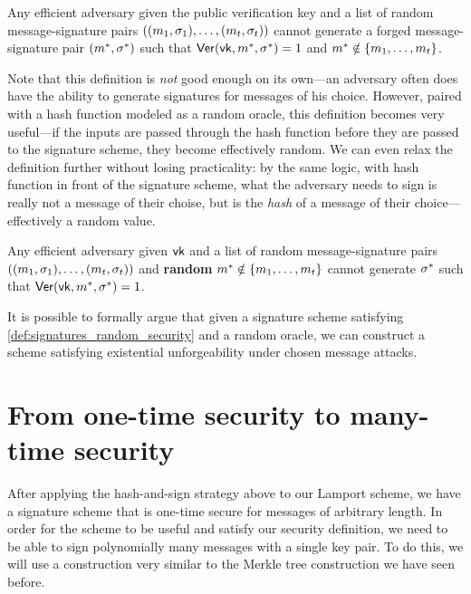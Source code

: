 \begin{definition}
Any efficient adversary given the public verification key and a list of random message-signature pairs $((m_1, \sigma_1), \ldots, (m_t, \sigma_t))$ cannot generate a forged
message-signature pair $(m^*, \sigma^*)$ 
such that $\mathsf{Ver}(\mathsf{vk}, m^*, \sigma^*) = 1$ and $m^* \notin \left\{ m_1, \ldots, m_t \right\}$.

\end{definition}

Note that this definition is \emph{not} good enough on its own---an adversary often does have the ability to generate signatures for messages of his choice. However, paired with a hash function modeled as a random oracle, this definition becomes very useful---if the inputs are passed through the hash function before they are passed to the signature scheme, they become effectively random. We can even relax the definition further without losing practicality: by the same logic, with hash function in front of the signature scheme, what the adversary needs to sign is really not a message of their choise, but is the \emph{hash} of a message of their choice---effectively a random value.

\begin{definition} \label{def:signatures_random_security}
	Any efficient adversary given $\mathsf{vk}$ and a list of random message-signature pairs $((m_1, \sigma_1), \ldots, (m_t, \sigma_t))$ and \textbf{random} $m^* \notin \left\{ m_1, \ldots, m_t \right\}$ cannot generate $\sigma^*$ such that $\mathsf{Ver}(\mathsf{vk}, m^*, \sigma^*) = 1$.
\end{definition}

It is possible to formally argue that given a signature scheme satisfying \cref{def:signatures_random_security} and a random oracle, we can construct a scheme satisfying existential unforgeability under chosen message attacks.

\section{From one-time security to many-time security}
\label{sec:sig:manytime}
After applying the hash-and-sign strategy above to our Lamport scheme, we
have a signature scheme that is one-time secure for messages of arbitrary
length. In order for the scheme to be useful and satisfy our security
definition, we need to be able to sign polynomially many messages with
a single key pair. To do this, we will use a construction very similar
to the Merkle tree construction we have seen before.

